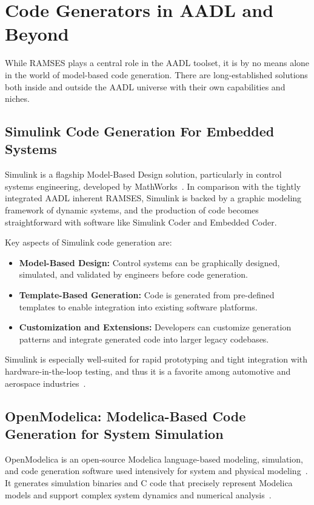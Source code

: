 \section{Code Generators in AADL and Beyond} \label{sub:code_generators}

While \gls{RAMSES} plays a central role in the \gls{AADL} toolset, it is by no means alone in the world of model-based code generation. There are long-established solutions both inside and outside the \gls{AADL} universe with their own capabilities and niches.


\subsection*{Simulink Code Generation For Embedded Systems}

Simulink is a flagship Model-Based Design solution, particularly in control systems engineering, developed by MathWorks~\cite{simulink_documentation}. In comparison with the tightly integrated \gls{AADL} inherent \gls{RAMSES}, Simulink is backed by a graphic modeling framework of dynamic systems, and the production of code becomes straightforward with software like Simulink Coder and Embedded Coder.

Key aspects of Simulink code generation are:
 \begin{itemize} 
 	\item \textbf{Model-Based Design:} Control systems can be graphically designed, simulated, and validated by engineers before code generation. 
 	\item \textbf{Template-Based Generation:} Code is generated from pre-defined templates to enable integration into existing software platforms. 
 	\item \textbf{Customization and Extensions:} Developers can customize generation patterns and integrate generated code into larger legacy codebases. 
 \end{itemize}

Simulink is especially well-suited for rapid prototyping and tight integration with hardware-in-the-loop testing, and thus it is a favorite among automotive and aerospace industries~\cite{Simulink_automotive_applications}.

\subsection*{OpenModelica: Modelica-Based Code Generation for System Simulation}

OpenModelica is an open-source Modelica language-based modeling, simulation, and code generation software used intensively for system and physical modeling~\cite{openmodelica-home}. It generates simulation binaries and C code that precisely represent Modelica models and support complex system dynamics and numerical analysis~\cite{openmodelica-codegen}.

